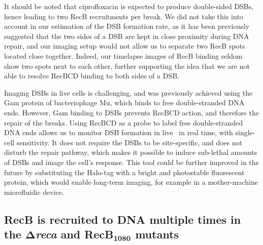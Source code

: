 It should be noted that ciprofloxacin is expected to produce double-sided DSBs, hence leading to two RecB recruitments per break. We did not take this into account in our estimation of the DSB formation rate, as it has been previously suggested that the two sides of a DSB are kept in close proximity during DNA repair\cite{Vickridge2017,Keyamura2019}, and our imaging setup would not allow us to separate two RecB spots located close together. Indeed, our timelapse images of RecB binding seldom show two spots next to each other, further supporting the idea that we are not able to resolve RecBCD binding to both sides of a DSB.

Imaging DSBs in live cells is challenging, and was previously achieved using the Gam protein of bacteriophage Mu, which binds to free double-stranded DNA ends\cite{Shee2013}. However, Gam binding to DSBs prevents RecBCD action, and therefore the repair of the breaks. Using RecBCD as a probe to label free double-stranded DNA ends allows us to monitor DSB formation in live \ecoli\ in real time, with single-cell sensitivity. It does not require the DSBs to be site-specific, and does not disturb the repair pathway, which makes it possible to induce sub-lethal amounts of DSBs and image the cell's response. This tool could be further improved in the future by substituting the Halo-tag with a bright and photostable fluorescent protein, which would enable long-term imaging, for example in a mother-machine microfluidic device.

\subsection*{RecB is recruited to DNA multiple times in the $\mathbf{\Delta}$\emph{reca} and RecB$\mathbf{_{1080}}$ mutants}

